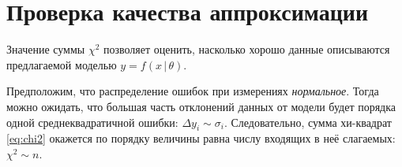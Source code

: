 

%


\section{Проверка качества аппроксимации}

Значение суммы $\chi^2$ позволяет оценить, насколько хорошо данные описываются
предлагаемой моделью $y=f(x\,|\,\theta)$.

Предположим, что распределение ошибок при измерениях \emph{нормальное}.
Тогда можно ожидать, что большая часть отклонений данных от модели будет
порядка одной среднеквадратичной ошибки: $\Delta y_{i}\sim\sigma_{i}$.
Следовательно, сумма хи-квадрат \eqref{eq:chi2} окажется по порядку
величины равна числу входящих в неё слагаемых: $\chi^{2}\sim n$.


